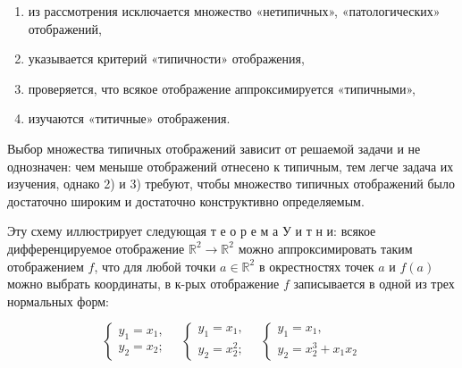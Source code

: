 \documentclass[10pt]{article}
\begin{document}
\begin{enumerate}

  \item из рассмотрения исключается множество «нетипичных», «патологических» отображений,



  \item указывается критерий «типичности» отображения,



  \item проверяется, что всякое отображение аппроксимируется «типичными»,



  \item изучаются «титичные» отображения.



\end{enumerate}



Выбор множества типичных отображений зависит от решаемой задачи и не однозначен: чем меныше отображений отнесено к типичным, тем легче задача их изучения, однако 2) и 3) требуют, чтобы множество типичных отображений было достаточно широким и достаточно конструктивно определяемым.



Эту схему иллюстрирует следующая т е о р е м а У и т н и: всякое дифференцируемое отображение $\mathbb{R}^{2} \rightarrow \mathbb{R}^{2}$ можно аппроксимировать таким отображением $f$, что для любой точки $a \in \mathbb{R}^{2}$ в окрестностях точек $a$ и $f(a)$ можно выбрать координаты, в к-рых отображение $f$ записывается в одной из трех нормальных форм:



\[

\left\{\begin{array} { l } 

{ y _ { 1 } = x _ { 1 } , } \\

{ y _ { 2 } = x _ { 2 } ; }

\end{array} \quad \left\{\begin{array} { l } 

{ y _ { 1 } = x _ { 1 } , } \\

{ y _ { 2 } = x _ { 2 } ^ { 2 } ; }

\end{array} \quad \left\{\begin{array}{l}

y_{1}=x_{1}, \\

y_{2}=x_{2}^{3}+x_{1} x_{2}

\end{array}\right.\right.\right.

\]
\end{document}
